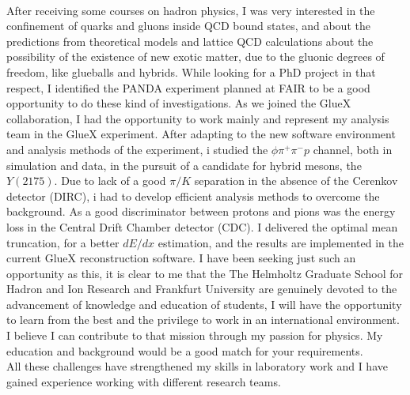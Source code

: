 \documentclass[a4paper,roman]{article}
\begin{document}
~\par After receiving some courses on hadron physics, I was very interested in the confinement of quarks and gluons inside QCD bound states, and about the predictions from theoretical models and lattice QCD calculations about the possibility of the existence of new exotic matter, due to the gluonic degrees of freedom, like glueballs and hybrids. While looking for a PhD project in that respect, I identified the PANDA experiment planned at FAIR to be a good opportunity to do these kind of investigations. As we joined the GlueX collaboration, I had the opportunity to work mainly and represent my analysis team in the GlueX experiment. After adapting to the new software environment and analysis methods of the experiment, i studied the $\phi\pi^{+}\pi^{-}p$ channel, both in simulation and data, in the pursuit of a candidate for hybrid mesons, the $Y(2175)$. Due to lack of a good $\pi/K$ separation in the absence of the Cerenkov detector (DIRC), i had to develop efficient analysis methods to overcome the background. As a good discriminator between protons and pions was the energy loss in the Central Drift Chamber detector (CDC). I delivered the optimal mean truncation, for a better $dE/dx$ estimation, and the results are implemented in the current GlueX reconstruction software. I have been seeking just such an opportunity as this, it is clear to me that the The Helmholtz Graduate School for Hadron and Ion Research and Frankfurt University are genuinely devoted to the advancement of knowledge and education of students, I will have the opportunity to learn from the best and the privilege to work in an international environment. I believe I can contribute to that mission through my passion for physics. My education and background would be a good match for your requirements.\\
All these challenges have strengthened my skills in laboratory work and I have gained experience working with different research teams.
\end{document}
